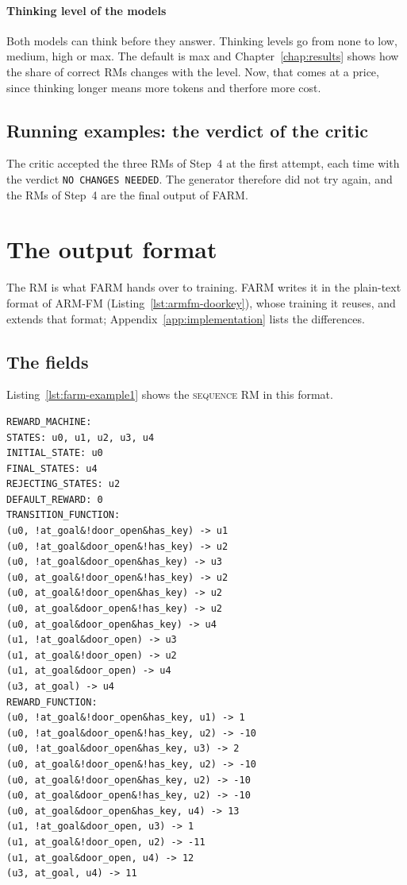 \documentclass[11pt,english,listoffigures,listoftables]{tfgetsinf}
\newcommand{\runex}[1]{\textsc{#1}}  %
\begin{document}
\paragraph{Thinking level of the models} Both models can think before they answer. Thinking levels go from none to low, medium, high or max. The default is max and Chapter~\ref{chap:results} shows how the share of correct RMs changes with the level. Now, that comes at a price, since thinking longer means more tokens and therfore more cost.

\subsection{Running examples: the verdict of the critic}
\label{sec:run-step5}
The critic accepted the three RMs of Step~4 at the first attempt, each time with the verdict \texttt{NO CHANGES NEEDED}. The generator therefore did not try again, and the RMs of Step~4 are the final output of FARM.

\section{The output format}
\label{sec:output-format}
The RM is what FARM hands over to training. FARM writes it in the plain-text format of ARM-FM (Listing~\ref{lst:armfm-doorkey}), whose training it reuses, and extends that format; Appendix~\ref{app:implementation} lists the differences.

\subsection{The fields}
Listing~\ref{lst:farm-example1} shows the \runex{sequence} RM in this format.

\noindent\begin{minipage}{\linewidth}
\begin{lstlisting}[style=rm,caption={The RM that FARM builds for the \runex{sequence} example.},label={lst:farm-example1}]
REWARD_MACHINE:
STATES: u0, u1, u2, u3, u4
INITIAL_STATE: u0
FINAL_STATES: u4
REJECTING_STATES: u2
DEFAULT_REWARD: 0
TRANSITION_FUNCTION:
(u0, !at_goal&!door_open&has_key) -> u1
(u0, !at_goal&door_open&!has_key) -> u2
(u0, !at_goal&door_open&has_key) -> u3
(u0, at_goal&!door_open&!has_key) -> u2
(u0, at_goal&!door_open&has_key) -> u2
(u0, at_goal&door_open&!has_key) -> u2
(u0, at_goal&door_open&has_key) -> u4
(u1, !at_goal&door_open) -> u3
(u1, at_goal&!door_open) -> u2
(u1, at_goal&door_open) -> u4
(u3, at_goal) -> u4
REWARD_FUNCTION:
(u0, !at_goal&!door_open&has_key, u1) -> 1
(u0, !at_goal&door_open&!has_key, u2) -> -10
(u0, !at_goal&door_open&has_key, u3) -> 2
(u0, at_goal&!door_open&!has_key, u2) -> -10
(u0, at_goal&!door_open&has_key, u2) -> -10
(u0, at_goal&door_open&!has_key, u2) -> -10
(u0, at_goal&door_open&has_key, u4) -> 13
(u1, !at_goal&door_open, u3) -> 1
(u1, at_goal&!door_open, u2) -> -11
(u1, at_goal&door_open, u4) -> 12
(u3, at_goal, u4) -> 11
\end{lstlisting}
\end{minipage}
\end{document}
